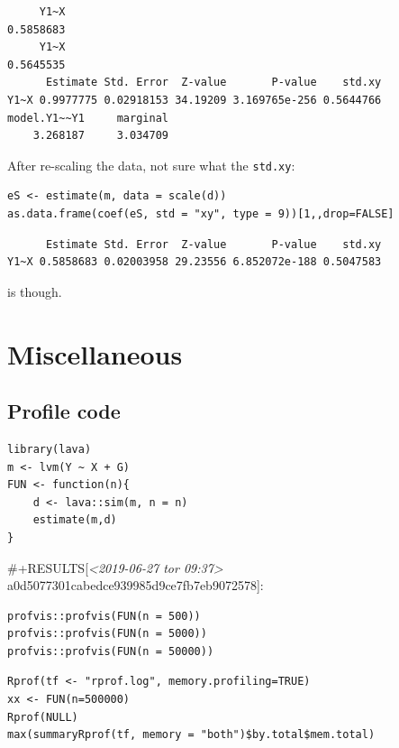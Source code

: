 \documentclass{article}
\begin{document}
\begin{verbatim}
     Y1~X 
0.5858683
     Y1~X 
0.5645535
      Estimate Std. Error  Z-value       P-value    std.xy
Y1~X 0.9977775 0.02918153 34.19209 3.169765e-256 0.5644766
model.Y1~~Y1     marginal 
    3.268187     3.034709
\end{verbatim}

After re-scaling the data, not sure what the \texttt{std.xy}:
\lstset{language=r,label= ,caption= ,captionpos=b,numbers=none}
\begin{lstlisting}
eS <- estimate(m, data = scale(d))
as.data.frame(coef(eS, std = "xy", type = 9))[1,,drop=FALSE]
\end{lstlisting}

\begin{verbatim}
      Estimate Std. Error  Z-value       P-value    std.xy
Y1~X 0.5858683 0.02003958 29.23556 6.852072e-188 0.5047583
\end{verbatim}

is though.

\section{Miscellaneous}
\label{sec:org3433686}
\subsection{Profile code}
\label{sec:orgc67231a}

\lstset{language=r,label= ,caption= ,captionpos=b,numbers=none}
\begin{lstlisting}
library(lava)
m <- lvm(Y ~ X + G)
FUN <- function(n){
    d <- lava::sim(m, n = n)
    estimate(m,d)
}
\end{lstlisting}

\#+RESULTS[\textit{<2019-06-27 tor 09:37> } a0d5077301cabedce939985d9ce7fb7eb9072578]:

\lstset{language=r,label= ,caption= ,captionpos=b,numbers=none}
\begin{lstlisting}
profvis::profvis(FUN(n = 500))
profvis::profvis(FUN(n = 5000))
profvis::profvis(FUN(n = 50000))
\end{lstlisting}

\lstset{language=r,label= ,caption= ,captionpos=b,numbers=none}
\begin{lstlisting}
Rprof(tf <- "rprof.log", memory.profiling=TRUE)
xx <- FUN(n=500000)
Rprof(NULL)
max(summaryRprof(tf, memory = "both")$by.total$mem.total)
\end{lstlisting}
\end{document}
